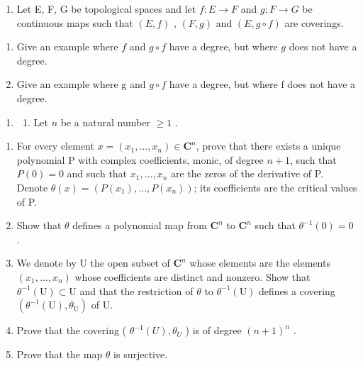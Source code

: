 \begin{enumerate}
\def\labelenumi{\arabic{enumi})}
\setcounter{enumi}{6}
\tightlist
\item
  Let E, F, G be topological spaces and let \(f: E \to F\) and \(g: F \to G\) be continuous maps such that \((E, f)\) , \((F, g)\) and \((E, g \circ f)\) are coverings.
\end{enumerate}

\begin{enumerate}
\def\labelenumi{\alph{enumi})}
\item
  Give an example where \(f\) and \(g \circ f\) have a degree, but where \(g\) does not have a degree.
\item
  Give an example where g and \(g \circ f\) have a degree, but where f does not have a degree.
\end{enumerate}

\begin{enumerate}
\def\labelenumi{\arabic{enumi})}
\setcounter{enumi}{7}
\tightlist
\item
  \begin{enumerate}
  \def\labelenumii{(\arabic{enumii})}
  \setcounter{enumii}{1}
  \tightlist
  \item
    Let \(n\) be a natural number \(\geqslant 1\) .
  \end{enumerate}
\end{enumerate}

\begin{enumerate}
\def\labelenumi{\alph{enumi})}
\item
  For every element \(x=(x_{1},\ldots,x_{n})\in\mathbf{C}^{n}\), prove that there exists a unique polynomial P with complex coefficients, monic, of degree \(n+1\), such that \(P(0)=0\) and such that \(x_{1},\ldots,x_{n}\) are the zeros of the derivative of P. Denote \(\theta(x)=(P(x_{1}),\ldots,P(x_{n}))\); its coefficients are the critical values of P.
\item
  Show that \(\theta\) defines a polynomial map from \(\mathbf{C}^n\) to \(\mathbf{C}^n\) such that \(\theta^{-1}(0) = 0\) .
\item
  We denote by U the open subset of \(\mathbf{C}^{n}\) whose elements are the elements \((x_{1},\ldots,x_{n})\) whose coefficients are distinct and nonzero. Show that \(\theta^{-1}\left(\mathrm{U}\right)\subset\mathrm{U}\) and that the restriction of \(\theta\) to \(\theta^{-1}\left(\mathrm{U}\right)\) defines a covering \((\theta^{-1}\left(\mathrm{U}\right),\theta_{\mathrm{U}})\) of U.
\item
  Prove that the covering ( \(\theta^{-1}(U),\theta_{U}\) ) is of degree \((n+1)^{n}\) .
\item
  Prove that the map \(\theta\) is surjective.
\end{enumerate}

